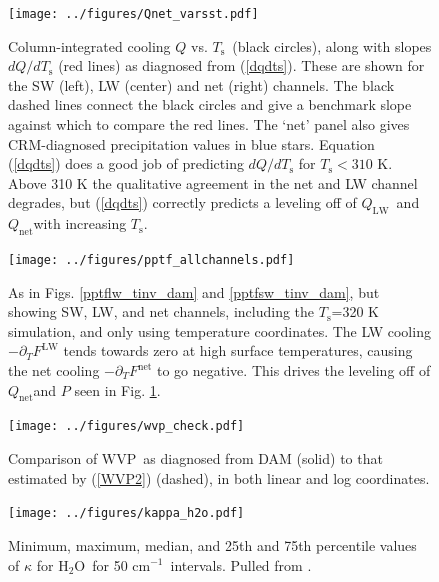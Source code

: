 \documentclass[10pt]{article}
\newcommand{\eqnref}[1]{(\ref{#1})}
\newcommand{\ppt}{\ensuremath{\partial_T}}
\newcommand{\htwo}{\ensuremath{\mathrm{H_2O}}}
\newcommand{\QLW}{\ensuremath{Q_\mathrm{LW}}}
\newcommand{\Qnet}{\ensuremath{Q_\mathrm{net}}}
\newcommand{\FLW}{\ensuremath{F^\mathrm{LW}}}
\newcommand{\Fnet}{\ensuremath{F^\mathrm{net}}}
\newcommand{\cminverse}{\ensuremath{\mathrm{cm^{-1}}}}
\newcommand{\Ts}{\ensuremath{T_\mathrm{s}}}
\newcommand{\WVP}{\ensuremath{\mathrm{WVP}}}
\begin{document}
\begin{figure}[h]
	\begin{center}
			\texttt{[image: ../figures/Qnet\_varsst.pdf]}
		\caption{Column-integrated cooling $Q$ vs. \Ts\ (black circles), along with slopes $d Q/d \Ts$ (red lines) as diagnosed from \eqnref{dqdts}. These are shown for the SW (left), LW (center) and net (right) channels.  The black dashed lines connect the black circles and give a benchmark slope against which to compare the red lines. The `net' panel also gives CRM-diagnosed precipitation values in blue stars. Equation \eqnref{dqdts} does a good job of predicting $d Q/d \Ts$ for $\Ts < 310$ K. Above 310 K the qualitative agreement in the net and LW channel degrades, but \eqnref{dqdts} correctly predicts a leveling off of \QLW\ and \Qnet with increasing \Ts. 
		\label{Qnet_varsst}
		}
	\end{center}
\end{figure}

\begin{figure}[h]
	\begin{center}
			\texttt{[image: ../figures/pptf\_allchannels.pdf]}
		\caption{As in Figs.  \ref{pptflw_tinv_dam} and \ref{pptfsw_tinv_dam}, but showing SW, LW, and net channels, including the \Ts=320 K simulation, and only using temperature coordinates. The LW cooling $-\ppt \FLW$ tends towards zero at high surface temperatures, causing the net cooling $-\ppt \Fnet$ to go negative. This drives the leveling off of  \Qnet and $P$ seen in Fig. \ref{Qnet_varsst}.
		\label{pptf_allchannels}
		}
	\end{center}
\end{figure}


\begin{figure}[h]
	\begin{center}
			\texttt{[image: ../figures/wvp\_check.pdf]}
		\caption{Comparison of \WVP\ as diagnosed from DAM (solid) to that estimated by \eqnref{WVP2} (dashed), in both linear and log coordinates.
		\label{wvp_check}
		}
	\end{center}
\end{figure}

\begin{figure}[h]
        \begin{center}
                        \texttt{[image: ../figures/kappa\_h2o.pdf]}
                \caption{Minimum, maximum, median, and 25th and 75th percentile 
values of $\kappa$ for \htwo\ for 50 \cminverse\ intervals. Pulled from \cite{pierrehumbert2010}.
                \label{kappa_h2o}
                }
        \end{center}
\end{figure}
\end{document}
